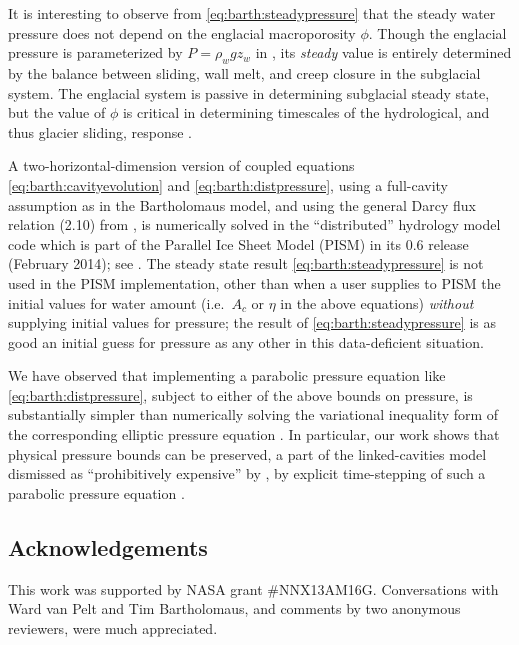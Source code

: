 \documentclass[twocolumn]{igs}
\begin{document}
It is interesting to observe from \eqref{eq:barth:steadypressure} that the steady water pressure does not depend on the englacial macroporosity $\phi$.  Though the englacial pressure is parameterized by $P=\rho_w g z_w$ in \cite{Bartholomausetal2011}, its \emph{steady} value is entirely determined by the balance between sliding, wall melt, and creep closure in the subglacial system.  The englacial system is passive in determining subglacial steady state, but the value of $\phi$ is critical in determining timescales of the hydrological, and thus glacier sliding, response \citep{vanPeltthesis}.

A two-horizontal-dimension version of coupled equations \eqref{eq:barth:cavityevolution} and \eqref{eq:barth:distpressure}, using a full-cavity assumption as in the Bartholomaus model, and using the general Darcy flux relation (2.10) from \cite{Schoofetal2012}, is numerically solved in the ``distributed'' hydrology model code which is part of the Parallel Ice Sheet Model (PISM) in its 0.6 release (February 2014); see \cite{BuelervanPeltDRAFT}.  The steady state result \eqref{eq:barth:steadypressure} is not used in the PISM implementation, other than when a user supplies to PISM the initial values for water amount (i.e.~$A_c$ or $\eta$ in the above equations) \emph{without} supplying initial values for pressure; the result of \eqref{eq:barth:steadypressure} is as good an initial guess for pressure as any other in this data-deficient situation.

We have observed that implementing a parabolic pressure equation like \eqref{eq:barth:distpressure}, subject to either of the above bounds on pressure, is substantially simpler than numerically solving the variational inequality form of the corresponding elliptic pressure equation \citep{Schoofetal2012}.  In particular, our work shows that physical pressure bounds can be preserved, a part of the linked-cavities model dismissed as ``prohibitively expensive'' by \cite{Werderetal2013}, by explicit time-stepping of such a parabolic pressure equation \citep{BuelervanPeltDRAFT}.

\subsection*{Acknowledgements}  This work was supported by NASA grant \#NNX13AM16G.  Conversations with Ward van Pelt and Tim Bartholomaus, and comments by two anonymous reviewers, were much appreciated.



\end{document}
